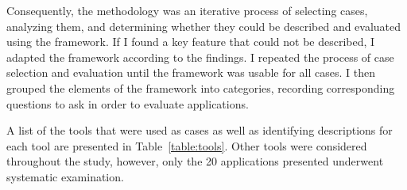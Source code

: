 {Consequently, the methodology was an iterative process of selecting cases, analyzing them, and determining whether they could be described and evaluated using the framework. If I found a key feature that could not be described, I adapted the framework according to the findings. I repeated the process of case selection and evaluation until the framework was usable for all cases. I then grouped the elements of the framework into categories, recording corresponding questions to ask in order to evaluate applications. 

A list of the tools that were used as cases as well as identifying descriptions for each tool are presented in Table~\ref{table:tools}. Other tools were considered throughout the study, however, only the 20 applications presented underwent systematic examination. 

\begin{table*}[htbp]
\small
\label{table:tools}
\caption{Web-based Information Discovery and Curation Tools}

\begin{tabular}{|p{0.20\linewidth}| p{0.30\linewidth}| p{0.45\linewidth}|}


\end{tabular}
\end{table*}}
